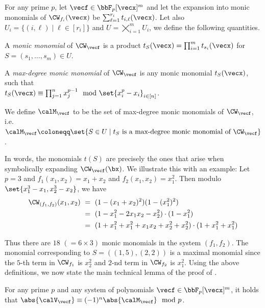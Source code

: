 \begin{definition}
\label{def:max-degreeMonomial}
For any prime $p$, let $\vecf \in \bbF_p[\vecx]^m$ and let the expansion into monic monomials of $\CW_{f_i}(\vecx)$ be $\sum_{\ell = 1}^{r_i} t_{i, \ell}(\vecx)$. Let also $U_i = \{(i, \ell) \mid \ell \in [r_i]\}$ and $U = \bigtimes_{i = 1}^m U_i$, we define the following quantities.
  \begin{Enumerate}
    \item A \textit{monic monomial} of $\CW_{\vecf}$ is a product $t_S(\vecx) = \prod_{i = 1}^m t_{s_i}(\vecx)$ for $S = (s_1, \ldots, s_m) \in U$.
	    \item A \textit{max-degree monic monomial} of $\CW_{\vecf}$ is any monic monomial $t_S(\vecx)$, such that\\
    $t_S(\vecx) \equiv \prod_{j = 1}^n x_j^{p - 1} \mod{\set{x_i^p - x_i}_{i \in [n]}}$.
    \item We define $\calM_{\vecf}$ to be the set of max-degree monic monomials of $\CW_{\vecf}$, i.e. \\
	$\calM_{\vecf} \coloneqq \set{S \in U \mid t_S \text{ is a max-degree monic monomial of } \CW_{\vecf}}$.
  \end{Enumerate}
\end{definition}

\noindent In words, the monomials $t(S)$ are precisely the ones that arise when symbolically expanding $\CW_{\vecf}(\bx)$. We illustrate this with an example: Let $p = 3$ and $f_1(x_1, x_2) = x_1 + x_2$ and $f_2(x_1, x_2) = x_1^2$. Then modulo $\set{x_1^3 - x_1, x_2^3 - x_2}$, we have
\begin{align*}
\CW_{(f_1,f_2)}(x_1, x_2) &~=~ (1 - (x_1 + x_2)^2)(1 - (x_1^2)^2)\\
&~=~ (1 - x_1^2 - 2 x_1 x_2 - x_2^2) \cdot (1 - x_1^2)\\
&~=~ (1 + x_1^2 + x_1^2 + x_1x_2 +x_2^2 + x_2^2) \cdot (1 + x_1^2 + x_1^2)
\end{align*}

\noindent Thus there are $18$ $(= 6 \times 3)$ monic monomials in the system $(f_1, f_2)$. The monomial corresponding to $S = ((1,5),(2,2))$ is a maximal monomial since the $5$-th term in $\CW_{f_1}$ is $x_2^2$ and $2$-nd term in $\CW_{f_2}$ is $x_1^2$. Using the above definitions, we now state the main technical lemma of the proof of \CWT.

\begin{lemma} \label{lem:mainLemmaInProofOfCWT}
   For any prime $p$ and any system of polynomials
  $\vecf \in \bbF_p[\vecx]^m$, it holds that
  $\abs{\calV_{\vecf}} \equiv (-1)^n \abs{\calM_{\vecf}} \mod{p}$.
\end{lemma}

